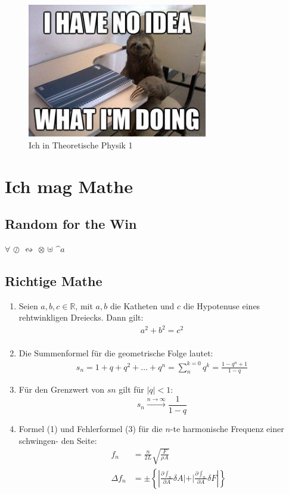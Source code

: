 \documentclass[]{scrartcl}
\begin{document}
\begin{figure}
\begin{center}
  \includegraphics[width=0.7\textwidth]{bild.jpg}
  \caption{Ich in Theoretische Physik 1}
  \label{fig:Bild1}
\end{center}
\end{figure}  


 
\section{Ich mag Mathe}
\subsection{Random for the Win}
$\forall$ $\oslash$ $\leftrightsquigarrow$ $\otimes$ $\uplus$ $\^{a}$

\subsection{Richtige Mathe}
\begin{enumerate}[label=(\Roman*)]
		\item Seien $a, b, c \in \mathds{R}$, mit $a, b$ die Katheten und $c$ die Hypotenuse eines rehtwinkligen Dreiecks. Dann gilt:
		\begin{align}
		a^2+b^2=c^2 \\
		\end{align}

        \item Die Summenformel für die geometrische Folge lautet:
        \begin{align}
		s_n = 1 + q + q^2 + \ldots +q^n =
		\sum_{n}^{k=0}q^k =
		\frac{1 - q^n+1}{1-q}
		\end{align}
		
		\item Für den Grenzwert von $s n$ gilt für $|q| < 1$:
		\[s_n \xrightarrow{ n \rightarrow \infty} \frac{1}{1 -q} \]
		
		\item Formel (1) und Fehlerformel (3) für die $n$-te harmonische Frequenz einer schwingen-
den Seite:
		\begin{align}
		&& f_n &= \frac{n}{2L} \sqrt{\frac{F}{\rho A}} \\
		&&  \Delta f_n  &= \pm \left \{ {\left|\frac{\partial \int_n}{\partial A}\delta A|+|\frac{\partial \int_n}{\partial A}\delta F\right|} \right \}  
		\end{align}
		
		\end{enumerate}
\end{document}
